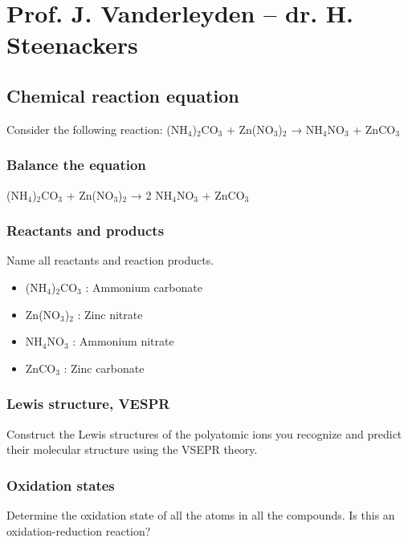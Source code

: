 \documentclass[11pt, a4paper,titlepage]{article}
\title{}
\author{Cedric Lood}
\date{\today}
\begin{document}
\renewcommand{\thesubsubsection}{\alph{subsubsection}.)}

\setcounter{tocdepth}{3}
\tableofcontents
\clearpage



\section{Prof. J. Vanderleyden – dr. H. Steenackers}
\label{sec-1}
\subsection{Chemical reaction equation}
\label{sec-1-1}


Consider the following reaction: (NH$_{4}$)$_{2}$CO$_{3}$ +  Zn(NO$_{3}$)$_{2}$ →  NH$_{4}$NO$_{3}$ + ZnCO$_{3}$
\subsubsection{Balance the equation}
\label{sec-1-1-1}

(NH$_{4}$)$_{2}$CO$_{3}$ +  Zn(NO$_{3}$)$_{2}$ →  2 NH$_{4}$NO$_{3}$ + ZnCO$_{3}$
\subsubsection{Reactants and products}
\label{sec-1-1-2}

Name all reactants and reaction products.

\begin{itemize}
\item (NH$_{4}$)$_{2}$CO$_{3}$ : Ammonium carbonate
\item Zn(NO$_{3}$)$_{2}$ : Zinc nitrate
\item NH$_{4}$NO$_{3}$ : Ammonium nitrate
\item ZnCO$_{3}$ : Zinc carbonate
\end{itemize}
\subsubsection{Lewis structure, VESPR}
\label{sec-1-1-3}

Construct the Lewis structures of the polyatomic ions you recognize
and predict their molecular structure using the VSEPR theory.
\subsubsection{Oxidation states}
\label{sec-1-1-4}

Determine the oxidation state of all the atoms in all the
compounds. Is this an oxidation-reduction reaction?
\end{document}
